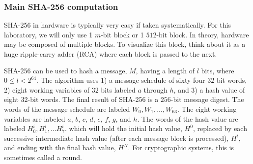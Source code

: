 \documentclass{article}
\begin{document}
\subsubsection{Main SHA-256 computation}

SHA-256 in hardware is typically very easy if taken systematically.
For this laboratory, we will only use 1 $m$-bit block or 1 $512$-bit
block.  In theory, hardware may be composed of multiple blocks.  To
visualize this block, think about it as a huge ripple-carry adder (RCA)
where each block is passed to the next.

SHA-256 can be used to hash a message, $M$, having a length of $l$
bits, where $0 \leq l < 2^{64}$. The
algorithm uses 1) a message schedule of sixty-four $32$-bit words,
2) eight working variables of $32$
bits labeled $a$ through $h$, and 3) a hash value of eight $32$-bit words.
The final result of SHA-256 is a $256$-bit
message digest.
The words of the message schedule are labeled
$W_0, W_1, \ldots, W_{63}$. The
eight working variables are labeled $a$, $b$, $c$, $d$, $e$, $f$, $g$,
and $h$.
The words of the hash value are labeled $H_0^i, H_1^i, \ldots H_7^i$.
which will hold the initial hash value, $H^0$, replaced by each
successive intermediate hash value
(after each message block is processed), $H^i$, and ending with the
final hash value, $H^N$.  For cryptographic systems, this is sometimes
called a round.
\end{document}
